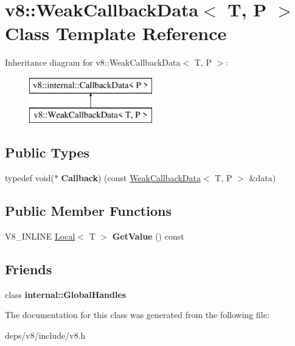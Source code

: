 \hypertarget{classv8_1_1_weak_callback_data}{}\section{v8\+:\+:Weak\+Callback\+Data$<$ T, P $>$ Class Template Reference}
\label{classv8_1_1_weak_callback_data}
Inheritance diagram for v8\+:\+:Weak\+Callback\+Data$<$ T, P $>$\+:\begin{figure}[H]
\begin{center}
\leavevmode
\includegraphics[height=2.000000cm]{classv8_1_1_weak_callback_data}
\end{center}
\end{figure}
\subsection*{Public Types}
\begin{DoxyCompactItemize}
\item 
\hypertarget{classv8_1_1_weak_callback_data_a08a29122f54c663fc2442d8f42c08ac2}{}typedef void($\ast$ {\bfseries Callback}) (const \hyperlink{classv8_1_1_weak_callback_data}{Weak\+Callback\+Data}$<$ T, P $>$ \&data)\label{classv8_1_1_weak_callback_data_a08a29122f54c663fc2442d8f42c08ac2}

\end{DoxyCompactItemize}
\subsection*{Public Member Functions}
\begin{DoxyCompactItemize}
\item 
\hypertarget{classv8_1_1_weak_callback_data_a0e8fcf0091132c96d548ac319284710a}{}V8\+\_\+\+I\+N\+L\+I\+N\+E \hyperlink{classv8_1_1_local}{Local}$<$ T $>$ {\bfseries Get\+Value} () const \label{classv8_1_1_weak_callback_data_a0e8fcf0091132c96d548ac319284710a}

\end{DoxyCompactItemize}
\subsection*{Friends}
\begin{DoxyCompactItemize}
\item 
\hypertarget{classv8_1_1_weak_callback_data_af107d8c7663669a5fd39ab41cf5ead03}{}class {\bfseries internal\+::\+Global\+Handles}\label{classv8_1_1_weak_callback_data_af107d8c7663669a5fd39ab41cf5ead03}

\end{DoxyCompactItemize}


The documentation for this class was generated from the following file\+:\begin{DoxyCompactItemize}
\item 
deps/v8/include/v8.\+h\end{DoxyCompactItemize}

